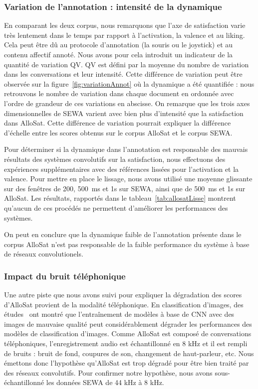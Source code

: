 \subsubsection{Variation de l'annotation : intensité de la dynamique}
En comparant les deux corpus, nous remarquons que l'axe de satisfaction varie très lentement dans le temps par rapport à l'activation, la valence et au liking. Cela peut être dû au protocole d'annotation (la souris ou le joystick) et au contenu affectif annoté. Nous avons pour cela introduit un indicateur de la quantité de variation QV. QV est défini par la moyenne du nombre de variation dans les conversations et leur intensité. Cette différence de variation peut être observée sur la figure~\ref{fig:variationAnnot} où la dynamique a été quantifiée : nous retrouvons le nombre de variation dans chaque document en ordonnée avec l'ordre de grandeur de ces variations en abscisse. On remarque que les trois axes dimensionnelles de SEWA varient avec bien plus d'intensité que la satisfaction dans AlloSat.%
Cette différence de variation pourrait expliquer la différence d'échelle entre les scores obtenus sur le corpus AlloSat et le corpus SEWA.


Pour déterminer si la dynamique dans l'annotation est responsable des mauvais résultats des systèmes convolutifs sur la satisfaction, nous effectuons des expériences supplémentaires avec des références lissées pour l'activation et la valence. Pour mettre en place le lissage, nous avons utilisé une moyenne glissante sur des fenêtres de 200, 500~ms et 1s sur SEWA, ainsi que de 500~ms et 1s sur AlloSat. Les résultats, rapportés dans le tableau~\ref{tab:allosatLisse} montrent qu'aucun de ces procédés ne permettent d'améliorer les performances des systèmes.



On peut en conclure que la dynamique faible de l'annotation présente dans le corpus AlloSat n'est pas responsable de la faible performance du système à base de réseaux convolutionels.

\subsubsection{Impact du bruit téléphonique}
Une autre piste que nous avons suivi pour expliquer la dégradation des scores d'AlloSat provient de la modalité téléphonique.
En classification d'images, des études~\cite{Roy2018,Dodge2016} ont montré que l'entraînement de modèles à base de CNN avec des images de mauvaise qualité peut considérablement dégrader les performances des modèles de classification d'images.
Comme AlloSat est composé de conversations téléphoniques, l'enregistrement audio est échantillonné en 8 kHz et il est rempli de bruits : bruit de fond, coupures de son, changement de haut-parleur, etc. Nous émettons donc l'hypothèse qu'AlloSat est trop dégradé pour être bien traité par des réseaux convolutifs.
Pour confirmer notre hypothèse, nous avons sous-échantillonné les données SEWA de 44 kHz à 8 kHz.

